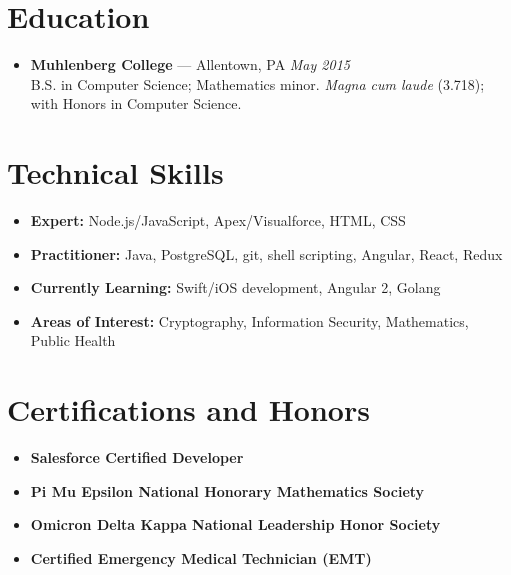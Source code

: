 \documentclass[11pt]{article}
\begin{document}
\section*{Education}
\begin{itemize}
  \item \textbf{Muhlenberg College} --- Allentown, PA \hfill {\em May 2015} \\
  B.S. in Computer Science; Mathematics minor. {\em Magna cum laude} (3.718); with Honors in Computer Science.
\end{itemize}



\section*{Technical Skills}
\begin{itemize}
  \item \textbf{Expert:} Node.js/JavaScript, Apex/Visualforce, HTML, CSS
  \item \textbf{Practitioner:} Java, PostgreSQL, git, shell scripting, Angular, React, Redux
  \item \textbf{Currently Learning:} Swift/iOS development, Angular 2, Golang
  \item \textbf{Areas of Interest:} Cryptography, Information Security, Mathematics, Public Health
\end{itemize}



\section*{Certifications and Honors}
\begin{itemize}
  \item \textbf{Salesforce Certified Developer}
  \item \textbf{Pi Mu Epsilon National Honorary Mathematics Society}
  \item \textbf{Omicron Delta Kappa National Leadership Honor Society}
  \item \textbf{Certified Emergency Medical Technician (EMT)}
\end{itemize}
\end{document}
